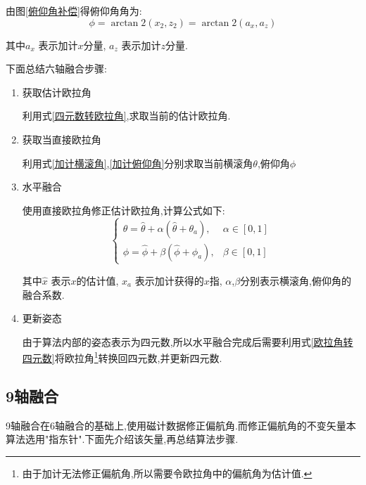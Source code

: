 由图\ref{俯仰角补偿}得俯仰角角为:
\begin{equation}\label{加计俯仰角}
    \phi = \arctan2(x_2,z_2) = \arctan2(a_x,a_z)
\end{equation} 

其中$a_x$   表示加计$x$分量,
$a_z$       表示加计$z$分量.

下面总结六轴融合步骤:
\begin{enumerate}
    \item 获取估计欧拉角

        利用式\ref{四元数转欧拉角},求取当前的估计欧拉角.
    \item 获取当直接欧拉角

        利用式\ref{加计横滚角},\ref{加计俯仰角}分别求取当前横滚角$\theta$,俯仰角$\phi$
    \item 水平融合

        使用直接欧拉角修正估计欧拉角,计算公式如下:
        \begin{equation}\label{水平融合}
            \left\{\!\!\!\begin{array}{ll}
                    \theta = \hat{\theta} + \alpha(\hat{\theta}+\theta_a), & \alpha \in [0, 1] \\
                    \phi   = \hat{\phi} + \beta(\hat{\phi}+\phi_a), & \beta \in [0, 1]
                \end{array}\right.
            \end{equation} 
            
            其中$\hat{x}$   表示$x$的估计值, 
            $x_a$           表示加计获得的$x$指,
            $\alpha$,$\beta$分别表示横滚角,俯仰角的融合系数.
    \item 更新姿态

        由于算法内部的姿态表示为四元数,所以水平融合完成后需要利用式\ref{欧拉角转四元数}将欧拉角\footnote{由于加计无法修正偏航角,所以需要令欧拉角中的偏航角为估计值.}转换回四元数,并更新四元数.
\end{enumerate}

\subsection{9轴融合}
9轴融合在6轴融合的基础上,使用磁计数据修正偏航角.而修正偏航角的不变矢量本算法选用"指东针".下面先介绍该矢量,再总结算法步骤.
